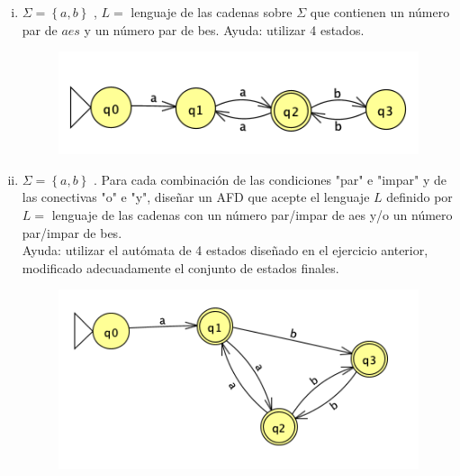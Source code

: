 \documentclass[
	12pt, %
]{fphw}
\begin{document}
\begin{enumerate}
\begin{enumerate}[(i)]
\begin{figure}[H]
    \end{figure}
    \newpage
  \item $\Sigma = \left\lbrace a,b \right\rbrace$ , $L= $ lenguaje de las cadenas sobre $\Sigma$ que contienen un número par de $aes$ y un número par de bes. Ayuda: utilizar 4 estados.\\
    \begin{figure}[H]
      \centering
      \includegraphics{images/problema_9.png}
    \end{figure}
  \item $\Sigma = \left\lbrace a,b \right\rbrace$ . Para cada combinación de las condiciones "par" e "impar" y de las conectivas "o" e "y", diseñar un AFD que acepte el lenguaje $L$ definido por\\
    $L= $ lenguaje de las cadenas con un número par/impar de aes y/o un número par/impar de bes.\\
    Ayuda: utilizar el autómata de 4 estados diseñado en el ejercicio anterior, modificado adecuadamente el conjunto de estados finales.
    \begin{figure}[H]
      \centering
      \includegraphics{images/problema_10.png}
    \end{figure}
  \end{enumerate}
\end{enumerate}
\end{document}

